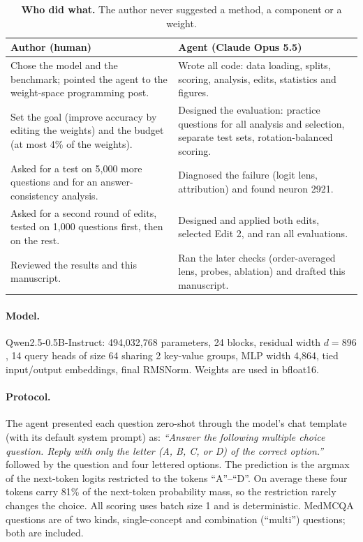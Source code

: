 \documentclass[11pt]{article}
\begin{document}
\begin{table}[t]
\centering\small
\caption{\textbf{Who did what.} The author never suggested a method, a component or a weight.}
\label{tab:roles}
\begin{tabular}{p{}p{}}
\toprule
Author (human) & Agent (Claude Opus 5.5) \\
\midrule
Chose the model and the benchmark; pointed the agent to the weight-space programming post. & Wrote all code: data loading, splits, scoring, analysis, edits, statistics and figures. \\
Set the goal (improve accuracy by editing the weights) and the budget (at most 4\% of the weights). & Designed the evaluation: practice questions for all analysis and selection, separate test sets, rotation-balanced scoring. \\
Asked for a test on 5{,}000 more questions and for an answer-consistency analysis. & Diagnosed the failure (logit lens, attribution) and found neuron 2921. \\
Asked for a second round of edits, tested on 1{,}000 questions first, then on the rest. & Designed and applied both edits, selected Edit 2, and ran all evaluations. \\
Reviewed the results and this manuscript. & Ran the later checks (order-averaged lens, probes, ablation) and drafted this manuscript. \\
\bottomrule
\end{tabular}
\end{table}

\paragraph{Model.} Qwen2.5-0.5B-Instruct: 494{,}032{,}768 parameters, 24 blocks, residual width $d=896$, 14 query heads of size 64 sharing 2 key-value groups, MLP width 4{,}864, tied input/output embeddings, final RMSNorm. Weights are used in bfloat16.

\paragraph{Protocol.} The agent presented each question zero-shot through the model's chat template (with its default system prompt) as: \emph{``Answer the following multiple choice question. Reply with only the letter (A, B, C, or D) of the correct option.''} followed by the question and four lettered options. The prediction is the argmax of the next-token logits restricted to the tokens ``A''--``D''. On average these four tokens carry 81\% of the next-token probability mass, so the restriction rarely changes the choice. All scoring uses batch size 1 and is deterministic. MedMCQA questions are of two kinds, single-concept and combination (``multi'') questions; both are included.
\end{document}
